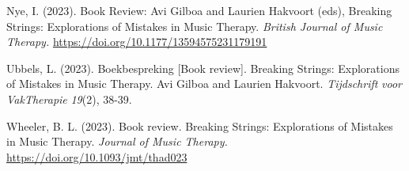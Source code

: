 \documentclass[authordate, empirical, issue]{jote-new-article}
\begin{document}
\hspace*{\parindent}Nye, I. (2023). Book Review: Avi Gilboa and Laurien Hakvoort (eds), Breaking Strings: Explorations of Mistakes in Music Therapy. \emph{British Journal of Music Therapy. }\url{https://doi.org/10.1177/13594575231179191}



Ubbels, L. (2023). Boekbespreking [Book review]. Breaking Strings: Explorations of Mistakes in Music Therapy. Avi Gilboa and Laurien Hakvoort. \emph{Tijdschrift}\emph{ }\emph{voor}\emph{ }\emph{VakTherapie}\emph{ 19}(2), 38-39.



Wheeler, B. L. (2023). Book review. Breaking Strings: Explorations of Mistakes in Music Therapy. \emph{Journal of Music Therapy. }\url{https://doi.org/10.1093/jmt/thad023}
\end{document}
